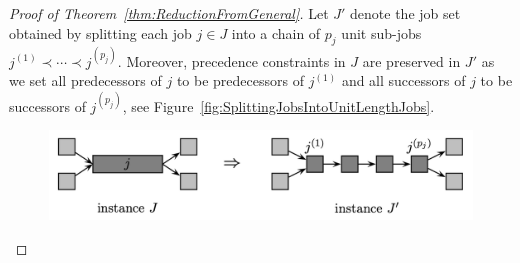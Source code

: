 \begin{proof}[Proof of Theorem~\ref{thm:ReductionFromGeneral}]
  Let $J'$ denote the job set obtained by splitting each job $j \in J$
  into a chain of $p_j$ unit sub-jobs $j^{(1)}\prec \cdots \prec j^{(p_j)}$. 
  Moreover, precedence constraints in $J$ are preserved in $J'$ as we set all 
  predecessors of $j$ to be predecessors of $j^{(1)}$ and all successors of $j$ to be successors of $j^{(p_j)}$, 
  see Figure~\ref{fig:SplittingJobsIntoUnitLengthJobs}.
  \begin{figure}
  \begin{center}
    \includegraphics[width=15cm]{chapters/scheduling1/split_jobs}

\end{center}
\end{figure}
\end{proof}
